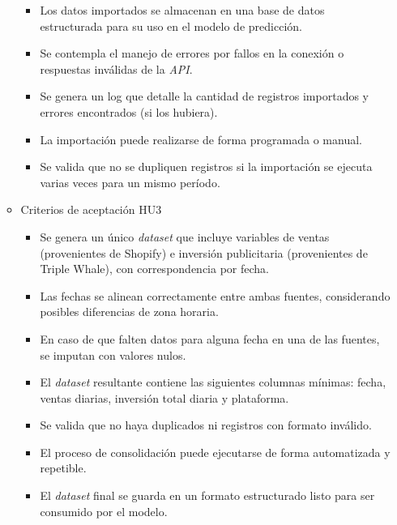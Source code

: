 \documentclass[
11pt, %
]{charter}
\begin{document}
\begin{itemize}
\begin{itemize}
\begin{itemize}
      \item Los datos importados se almacenan en una base de datos estructurada para su uso en el modelo de predicción.

      \item Se contempla el manejo de errores por fallos en la conexión o respuestas inválidas de la \textit{API}.

      \item Se genera un log que detalle la cantidad de registros importados y errores encontrados (si los hubiera).

      \item La importación puede realizarse de forma programada o manual.

      \item Se valida que no se dupliquen registros si la importación se ejecuta varias veces para un mismo período.      
      \end{itemize}
      
      \item Criterios de aceptación HU3

    \begin{itemize}
    		\item Se genera un único \textit{dataset} que incluye variables de ventas (provenientes de Shopify) e inversión publicitaria (provenientes de Triple Whale), con correspondencia por fecha.

		\item Las fechas se alinean correctamente entre ambas fuentes, considerando posibles diferencias de zona horaria.

		\item En caso de que falten datos para alguna fecha en una de las fuentes, se imputan con valores nulos.

		\item El \textit{dataset} resultante contiene las siguientes columnas mínimas: fecha, ventas diarias, inversión total diaria y plataforma.

		\item Se valida que no haya duplicados ni registros con formato inválido.

		\item El proceso de consolidación puede ejecutarse de forma automatizada y repetible.

		\item El \textit{dataset} final se guarda en un formato estructurado listo para ser consumido por el modelo.


\end{itemize}
\end{itemize}
\end{itemize}
\end{document}
